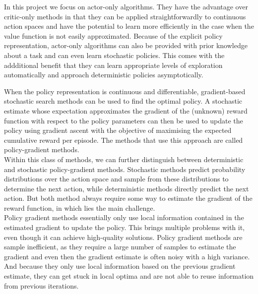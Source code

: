 \documentclass[10pt]{article}
\begin{document}
In this project we focus on actor-only algorithms.
They have the advantage over critic-only methods in that they can be applied straightforwardly to continuous action spaces and have the potential to learn more efficiently in the case when the value function is not easily approximated.
Because of the explicit policy representation, actor-only algorithms can also be provided with prior knowledge about a task and can even learn stochastic policies.
This comes with the addditional benefit that they can learn appropriate levels
of exploration automatically and approach deterministic policies asymptotically.
\cite{RL}

When the policy representation is continuous and differentiable, gradient-based stochastic search methods
can be used to find the optimal policy.
A stochastic estimate whose expectation approximates the gradient
of the (unknown) reward function with respect to the policy parameters can then be used to update the policy using
gradient ascent with the objective of maximising the expected cumulative reward per episode.
The methods that use this approach are called policy-gradient methods.\\
Within this class of methods, we can further distinguish between deterministic and stochastic policy-gradient methods.
Stochastic methods predict probability distributions over the action space and sample from these distributions to determine the next action, while deterministic methods directly predict the next action.
But both method always require some way to estimate the gradient of the reward function, in which lies the main challenge.\\
Policy gradient methods essentially only use local information contained in the estimated gradient to update the policy. This brings multiple problems with it, even though it can achieve high-quality solutions.
Policy gradient methods are sample inefficient, as they require a large number of samples to estimate the gradient and even then the gradient estimate is often noisy with a high variance. And because they only use local information based on the previous gradient estimate, they can get stuck in local optima
and are not able to reuse information from previous iterations.
\cite{slides, RL}
\end{document}
